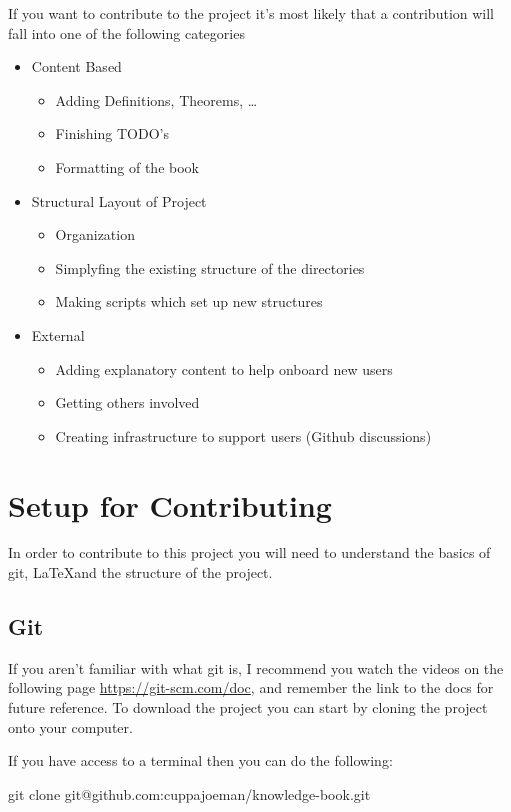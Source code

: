 If you want to contribute to the project it's most likely that a contribution will fall into one of the following categories
\begin{itemize}
  \item Content Based 
  \begin{itemize}
      \item Adding Definitions, Theorems, \ldots
      \item Finishing TODO's
      \item Formatting of the book
  \end{itemize}
  \item Structural Layout of Project 
  \begin{itemize}
      \item Organization
      \item Simplyfing the existing structure of the directories 
      \item Making scripts which set up new structures
  \end{itemize}
  \item External
  \begin{itemize}
      \item Adding explanatory content to help onboard new users
      \item Getting others involved
      \item Creating infrastructure to support users (Github discussions)
  \end{itemize}
\end{itemize}

\section*{Setup for Contributing}
In order to contribute to this project you will need to understand the basics of git, \LaTeX and the structure of the project.

\subsection*{Git}
If you aren't familiar with what git is, I recommend you watch the videos on the following page \url{https://git-scm.com/doc}, and remember the link to the docs for future reference. To download the project you can start by cloning the project onto your computer.

If you have access to a terminal then you can do the following:

\begin{term}
git clone git@github.com:cuppajoeman/knowledge-book.git
\end{term}

